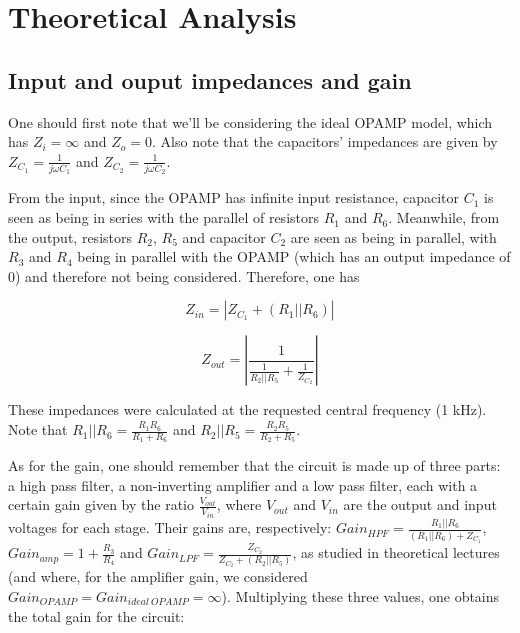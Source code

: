 \section{Theoretical Analysis}
\label{sec:analysis}



\subsection{Input and ouput impedances and gain}

One should first note that we'll be considering the ideal OPAMP model, which has $Z_i = \infty$ and $Z_o = 0$. Also note that the capacitors' impedances are given by $Z_{C_1} = \frac{1}{j \omega C_1}$ and $Z_{C_2} = \frac{1}{j \omega C_2}$. 



From the input, since the OPAMP has infinite input resistance, capacitor $C_1$ is seen as being in series with the parallel of resistors $R_1$ and $R_6$. Meanwhile, from the output, resistors $R_2$, $R_5$ and capacitor $C_2$ are seen as being in parallel, with $R_3$ and $R_4$ being in parallel with the OPAMP (which has an output impedance of $0$) and therefore not being considered. Therefore, one has

\begin{equation}
Z_{in} = |Z_{C_1} + (R_1||R_6)|
\end{equation}

\begin{equation}
Z_{out} = \left|\frac{1}{\frac{1}{R_2 || R_5} + \frac{1}{Z_{C_2}}}\right|
\end{equation}

These impedances were calculated at the requested central frequency (1 kHz). Note that $R_1||R_6 = \frac{R_1 R_6}{R_1 + R_6}$ and $R_2||R_5 = \frac{R_2 R_5}{R_2 + R_5}$.




As for the gain, one should remember that the circuit is made up of three parts: a high pass filter, a non-inverting amplifier and a low pass filter, each with a certain gain given by the ratio $\frac{V_{out}}{V_{in}}$, where $V_{out}$ and $V_{in}$ are the output and input voltages for each stage. Their gains are, respectively: $Gain_{HPF} = \frac{R_1||R_6}{(R_1||R_6) + Z_{C_1}}$, $Gain_{amp} = 1+\frac{R_3}{R_4}$ and $Gain_{LPF} = \frac{Z_{C_2}}{Z_{C_2}+(R_2||R_5)}$, as studied in theoretical lectures (and where, for the amplifier gain, we considered $Gain_{OPAMP} = Gain_{ideal \ OPAMP} = \infty$). Multiplying these three values, one obtains the total gain for the circuit:

